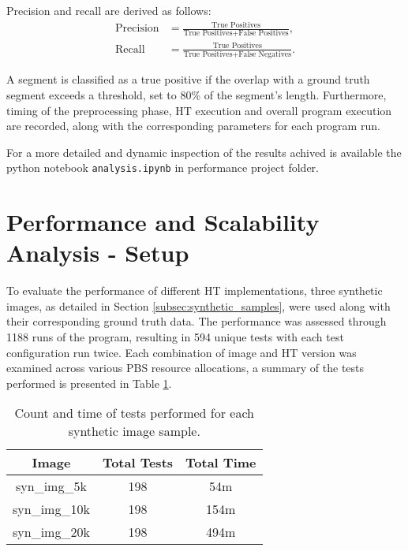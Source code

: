 \documentclass[conference]{IEEEtran}
\begin{document}
    Precision and recall are derived as follows:
    \begin{align*}
        \text{Precision} &= \frac{\text{True Positives}}{\text{True Positives} + \text{False Positives}}, \\
        \text{Recall} &= \frac{\text{True Positives}}{\text{True Positives} + \text{False Negatives}}.
    \end{align*}
    
    A segment is classified as a true positive if the overlap with a ground truth segment exceeds a threshold, set to 80\% of the segment's length.
    Furthermore, timing of the preprocessing phase, HT execution and overall program execution are recorded, along with the corresponding parameters for each program run.

    For a more detailed and dynamic inspection of the results achived is available the python notebook \texttt{analysis.ipynb} in performance project folder.
    
\section{Performance and Scalability Analysis - Setup}
\label{sec::psanalysis}
    
    To evaluate the performance of different HT implementations, three synthetic images, as detailed in Section \ref{subsec:synthetic_samples}, were used along with their corresponding ground truth data. The performance was assessed through 1188 runs of the program, resulting in 594 unique tests with each test configuration run twice. Each combination of image and HT version was examined across various PBS resource allocations, a summary of the tests performed is presented in Table \ref{tab:evaluation_general}.
    
    \begin{table}[ht]
    \centering
    \caption{Count and time of tests performed for each synthetic image sample.}
    \label{tab:evaluation_general}
    \begin{tabular}{|c|c|c|}
    \hline
    \textbf{Image} & \textbf{Total Tests} & \textbf{Total Time} \\ 
    \hline
    syn\_img\_5k & 198 & 54m \\ \hline
    syn\_img\_10k & 198 & 154m \\ \hline
    syn\_img\_20k & 198 & 494m \\ \hline
    \end{tabular}
    \end{table}
    
\end{document}
